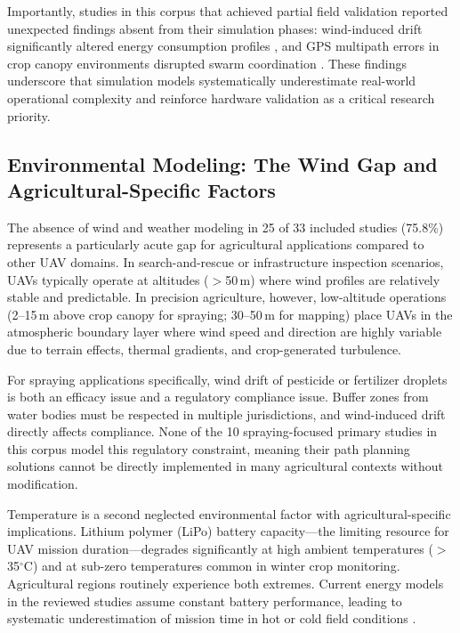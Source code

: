 \documentclass[review,3p,times]{elsarticle}
\begin{document}
Importantly, studies in this corpus that achieved partial field validation reported unexpected findings absent from their simulation phases: wind-induced drift significantly altered energy consumption profiles \cite{liu2021}, and GPS multipath errors in crop canopy environments disrupted swarm coordination \cite{pan2022}. These findings underscore that simulation models systematically underestimate real-world operational complexity and reinforce hardware validation as a critical research priority.

\subsection{Environmental Modeling: The Wind Gap and Agricultural-Specific Factors}
\label{sec:envmodel}

The absence of wind and weather modeling in 25 of 33 included studies (75.8\%) represents a particularly acute gap for agricultural applications compared to other UAV domains. In search-and-rescue or infrastructure inspection scenarios, UAVs typically operate at altitudes ($>$50\,m) where wind profiles are relatively stable and predictable. In precision agriculture, however, low-altitude operations (2--15\,m above crop canopy for spraying; 30--50\,m for mapping) place UAVs in the atmospheric boundary layer where wind speed and direction are highly variable due to terrain effects, thermal gradients, and crop-generated turbulence.

For spraying applications specifically, wind drift of pesticide or fertilizer droplets is both an efficacy issue and a regulatory compliance issue. Buffer zones from water bodies must be respected in multiple jurisdictions, and wind-induced drift directly affects compliance. None of the 10 spraying-focused primary studies in this corpus model this regulatory constraint, meaning their path planning solutions cannot be directly implemented in many agricultural contexts without modification.

Temperature is a second neglected environmental factor with agricultural-specific implications. Lithium polymer (LiPo) battery capacity---the limiting resource for UAV mission duration---degrades significantly at high ambient temperatures ($>$35$^\circ$C) and at sub-zero temperatures common in winter crop monitoring. Agricultural regions routinely experience both extremes. Current energy models in the reviewed studies assume constant battery performance, leading to systematic underestimation of mission time in hot or cold field conditions \cite{aitsaadi2022}.
\end{document}
